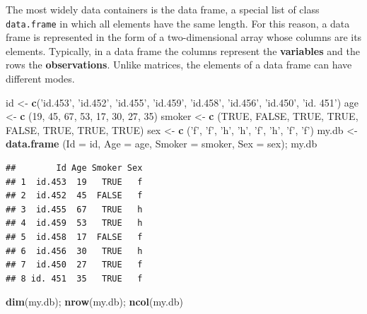 \documentclass[]{book}
\newenvironment{Shaded}{\begin{snugshade}}{\end{snugshade}}
\newcommand{\DataTypeTok}[1]{\textcolor[rgb]{0.13,0.29,0.53}{#1}}
\newcommand{\DecValTok}[1]{\textcolor[rgb]{0.00,0.00,0.81}{#1}}
\newcommand{\KeywordTok}[1]{\textcolor[rgb]{0.13,0.29,0.53}{\textbf{#1}}}
\newcommand{\NormalTok}[1]{#1}
\newcommand{\OtherTok}[1]{\textcolor[rgb]{0.56,0.35,0.01}{#1}}
\newcommand{\StringTok}[1]{\textcolor[rgb]{0.31,0.60,0.02}{#1}}
\begin{document}
The most widely data containers is the data frame, a special list of class \texttt{data.frame} in which all elements have the same length. For this reason, a data frame is represented in the form of a two-dimensional array whose columns are its elements. Typically, in a data frame the columns represent the \textbf{variables} and the rows the \textbf{observations}. Unlike matrices, the elements of a data frame can have different modes.

\begin{Shaded}
\begin{Highlighting}[]
\NormalTok{id <-}\StringTok{ }\KeywordTok{c}\NormalTok{(}\StringTok{'id.453'}\NormalTok{, }\StringTok{'id.452'}\NormalTok{, }\StringTok{'id.455'}\NormalTok{, }\StringTok{'id.459'}\NormalTok{, }\StringTok{'id.458'}\NormalTok{, }\StringTok{'id.456'}\NormalTok{, }\StringTok{'id.450'}\NormalTok{, }\StringTok{'id. 451'}\NormalTok{)}
\NormalTok{age <-}\StringTok{ }\KeywordTok{c}\NormalTok{ (}\DecValTok{19}\NormalTok{, }\DecValTok{45}\NormalTok{, }\DecValTok{67}\NormalTok{, }\DecValTok{53}\NormalTok{, }\DecValTok{17}\NormalTok{, }\DecValTok{30}\NormalTok{, }\DecValTok{27}\NormalTok{, }\DecValTok{35}\NormalTok{)}
\NormalTok{smoker <-}\StringTok{ }\KeywordTok{c}\NormalTok{ (}\OtherTok{TRUE}\NormalTok{, }\OtherTok{FALSE}\NormalTok{, }\OtherTok{TRUE}\NormalTok{, }\OtherTok{TRUE}\NormalTok{, }\OtherTok{FALSE}\NormalTok{, }\OtherTok{TRUE}\NormalTok{, }\OtherTok{TRUE}\NormalTok{, }\OtherTok{TRUE}\NormalTok{)}
\NormalTok{sex <-}\StringTok{ }\KeywordTok{c}\NormalTok{ (}\StringTok{'f'}\NormalTok{, }\StringTok{'f'}\NormalTok{, }\StringTok{'h'}\NormalTok{, }\StringTok{'h'}\NormalTok{, }\StringTok{'f'}\NormalTok{, }\StringTok{'h'}\NormalTok{, }\StringTok{'f'}\NormalTok{, }\StringTok{'f'}\NormalTok{)}
\NormalTok{my.db <-}\StringTok{ }\KeywordTok{data.frame}\NormalTok{ (}\DataTypeTok{Id =}\NormalTok{ id, }\DataTypeTok{Age =}\NormalTok{ age, }\DataTypeTok{Smoker =}\NormalTok{ smoker, }\DataTypeTok{Sex =}\NormalTok{ sex); my.db}
\end{Highlighting}
\end{Shaded}

\begin{verbatim}
##        Id Age Smoker Sex
## 1  id.453  19   TRUE   f
## 2  id.452  45  FALSE   f
## 3  id.455  67   TRUE   h
## 4  id.459  53   TRUE   h
## 5  id.458  17  FALSE   f
## 6  id.456  30   TRUE   h
## 7  id.450  27   TRUE   f
## 8 id. 451  35   TRUE   f
\end{verbatim}

\begin{Shaded}
\begin{Highlighting}[]
\KeywordTok{dim}\NormalTok{(my.db); }\KeywordTok{nrow}\NormalTok{(my.db); }\KeywordTok{ncol}\NormalTok{(my.db)}
\end{Highlighting}
\end{Shaded}
\end{document}
